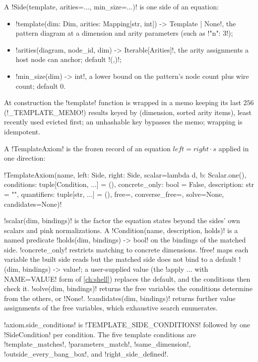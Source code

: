 \begin{definition}\label{def:rewriting-axiom}
A \py!Side(template, arities=..., min_size=...)! is one side of an equation:
\begin{itemize}
\item \py!template(dim: Dim, arities: Mapping[str, int]) -> Template | None!, the pattern
  diagram at a dimension and arity parameters (such as \code!{"n": 3}!);
\item \py!arities(diagram, node_id, dim) -> Iterable[Arities]!, the arity assignments a host node
  can anchor; default \py!({},)!;
\item \py!min_size(dim) -> int!, a lower bound on the pattern's node count plus wire count;
  default $0$.
\end{itemize}
At construction the \py!template! function is wrapped in a memo keeping its last $256$
(\py!_TEMPLATE_MEMO!) results keyed by (dimension, sorted arity items), least recently used
evicted first; an unhashable key bypasses the memo; wrapping is idempotent.

A \py!TemplateAxiom! is the frozen record of an equation $\mathit{left} = \mathit{right}\cdot s$
applied in one direction:
\begin{signature}
\py!TemplateAxiom(name, left: Side, right: Side, scalar=lambda d, b: Scalar.one(), conditions: tuple[Condition, ...] = (), concrete_only: bool = False, description: str = "", quantifiers: tuple[str, ...] = (), free={}, converse_free={}, solve=None, candidates=None)!
\end{signature}
\py!scalar(dim, bindings)! is the factor the equation states beyond the sides' own scalars and pink
normalizations. A \py!Condition(name, description, holds)! is a named predicate
\py!holds(dim, bindings) -> bool! on the bindings of the matched side. \py!concrete_only!
restricts matching to concrete dimensions. \py!free! maps each variable the built side reads but
the matched side does not bind to a default \py!(dim, bindings) -> value!; a user-supplied value
(the \azx!apply ... with NAME=VALUE! form of \cref{ch:shell}) replaces the default, and the
conditions then check it. \py!solve(dim, bindings)! returns the free variables the conditions
determine from the others, or \py!None!. \py!candidates(dim, bindings)! returns further value
assignments of the free variables, which exhaustive search enumerates.
\end{definition}

\py!axiom.side_conditions! is \py!TEMPLATE_SIDE_CONDITIONS! followed by one \py!SideCondition!
per condition. The five template conditions are \code!template_matches!, \code!parameters_match!,
\code!same_dimension!, \code!outside_every_bang_box!, and \code!right_side_defined!.

